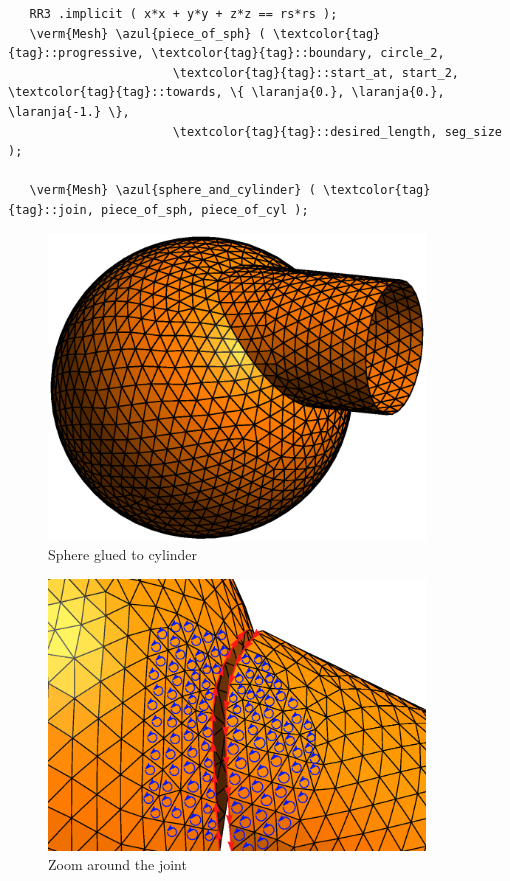 \begin{Verbatim}
   RR3 .implicit ( x*x + y*y + z*z == rs*rs );
   \verm{Mesh} \azul{piece_of_sph} ( \textcolor{tag}{tag}::progressive, \textcolor{tag}{tag}::boundary, circle_2,
                       \textcolor{tag}{tag}::start_at, start_2, \textcolor{tag}{tag}::towards, \{ \laranja{0.}, \laranja{0.}, \laranja{-1.} \},
                       \textcolor{tag}{tag}::desired_length, seg_size                         );
                       
   \verm{Mesh} \azul{sphere_and_cylinder} ( \textcolor{tag}{tag}::join, piece_of_sph, piece_of_cyl );
\end{Verbatim}

\begin{figure} \centering
 \includegraphics[width=100mm]{sphere-cyl}
  \caption{Sphere glued to cylinder}
  \label{\numb section 3.\numb fig 5}
\end{figure}

\begin{figure}[ht] \centering
 \includegraphics[width=100mm]{crack}
  \caption{Zoom around the joint}
  \label{\numb section 3.\numb fig 6}
\end{figure}

